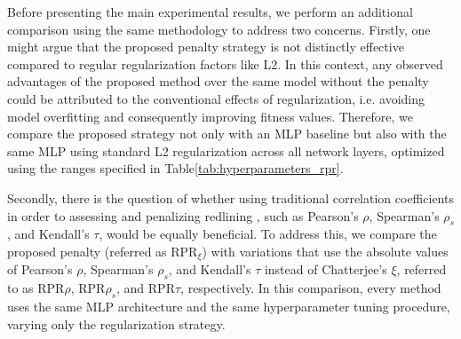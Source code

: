 Before presenting the main experimental results, we perform an additional comparison using the same methodology to address two concerns. Firstly, one might argue that the proposed penalty strategy is not distinctly effective compared to regular regularization factors like L2. In this context, any observed advantages of the proposed method over the same model without the penalty could be attributed to the conventional effects of regularization, i.e. avoiding model overfitting and consequently improving fitness values. Therefore, we compare the proposed strategy not only with an MLP baseline but also with the same MLP using standard L2 regularization across all network layers, optimized using the ranges specified in Table\ref{tab:hyperparameters_rpr}. 

Secondly, there is the question of whether using traditional correlation coefficients in order to assessing and penalizing redlining , such as Pearson's $\rho$, Spearman's $\rho_s$, and Kendall's $\tau$, would be equally beneficial. To address this, we compare the proposed penalty (referred as RPR$_\xi$) with variations that use the absolute values of Pearson's $\rho$, Spearman's $\rho_s$, and Kendall's $\tau$ instead of Chatterjee's $\xi$, referred to as RPR$\rho$, RPR${\rho_s}$, and RPR$\tau$, respectively. In this comparison, every method uses the same MLP architecture and the same hyperparameter tuning procedure, varying only the regularization strategy.

